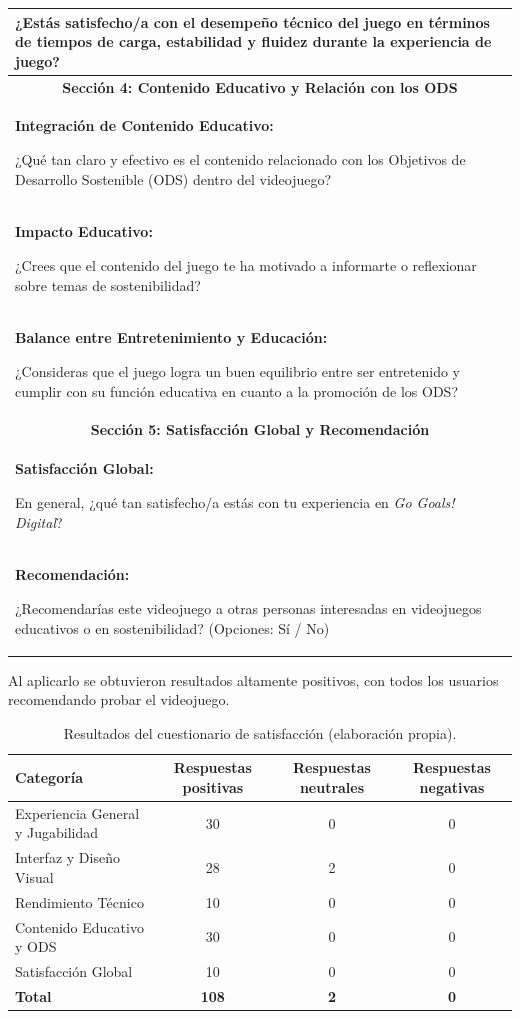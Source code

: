 \begin{longtable}{|p{}|}
¿Estás satisfecho/a con el desempeño técnico del juego en términos de tiempos de carga, estabilidad y fluidez durante la experiencia de juego? \\
\hline
\multicolumn{1}{|c|}{\textbf{Sección 4: Contenido Educativo y Relación con los ODS}} \\
\hline
\textbf{Integración de Contenido Educativo:}

¿Qué tan claro y efectivo es el contenido relacionado con los Objetivos de Desarrollo Sostenible (ODS) dentro del videojuego? \\
\hline
\textbf{Impacto Educativo:}

¿Crees que el contenido del juego te ha motivado a informarte o reflexionar sobre temas de sostenibilidad? \\
\hline
\textbf{Balance entre Entretenimiento y Educación:}

¿Consideras que el juego logra un buen equilibrio entre ser entretenido y cumplir con su función educativa en cuanto a la promoción de los ODS? \\
\hline
\multicolumn{1}{|c|}{\textbf{Sección 5: Satisfacción Global y Recomendación}} \\
\hline
\textbf{Satisfacción Global:}

En general, ¿qué tan satisfecho/a estás con tu experiencia en \textit{Go Goals! Digital}? \\
\hline
\textbf{Recomendación:}

¿Recomendarías este videojuego a otras personas interesadas en videojuegos educativos o en sostenibilidad? (Opciones: Sí / No) \\
\hline
\end{longtable}

Al aplicarlo se obtuvieron resultados altamente positivos, con todos los usuarios recomendando probar el videojuego.
\begin{table}[H]
\centering
\caption{Resultados del cuestionario de satisfacción (elaboración propia).\label{tab:resultados_cuestionario}}
\renewcommand{\arraystretch}{1.3}
\begin{tabular}{|l|c|c|c|}
\hline
\textbf{Categoría} & \textbf{Respuestas positivas} & \textbf{Respuestas neutrales} & \textbf{Respuestas negativas} \\
\hline
Experiencia General y Jugabilidad & 30 & 0 & 0 \\
\hline
Interfaz y Diseño Visual & 28 & 2 & 0 \\
\hline
Rendimiento Técnico & 10 & 0 & 0 \\
\hline
Contenido Educativo y ODS & 30 & 0 & 0 \\
\hline
Satisfacción Global & 10 & 0 & 0 \\
\hline
\textbf{Total} & \textbf{108} & \textbf{2} & \textbf{0} \\
\hline
\end{tabular}
\end{table}


